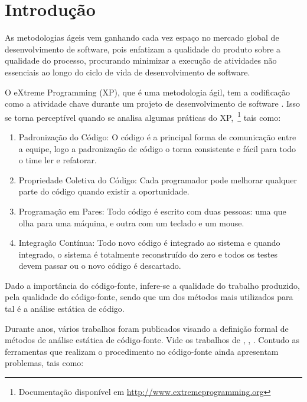 \chapter{Introdução}

As metodologias ágeis vem ganhando cada vez espaço no mercado global 
de desenvolvimento de software, pois enfatizam a qualidade do produto 
sobre a qualidade do processo, procurando minimizar a execução 
de atividades não essenciais ao longo do ciclo de vida de 
desenvolvimento de software. 

O eXtreme Programming (XP), que é uma metodologia ágil, tem a codificação como a 
atividade chave durante um projeto de desenvolvimento de software 
\cite{beck1999}. Isso se torna perceptível quando se analisa algumas práticas do 
XP,~\footnote{Documentação disponível em \url{http://www.extremeprogramming.org}}
tais como:

\begin{enumerate}
\item Padronização do Código: O código é a principal forma de comunicação entre 
a equipe, logo a padronização de código o torna consistente e fácil para todo o 
time ler e refatorar. 
\item Propriedade Coletiva do Código: Cada programador pode melhorar qualquer 
parte do código quando existir a oportunidade.
\item Programação em Pares: Todo código é escrito com duas pessoas: uma que olha 
para uma máquina, e outra com um teclado e um mouse.
\item Integração Contínua: Todo novo código é integrado ao sistema e quando 
integrado, o sistema é totalmente reconstruído do zero e todos os testes devem 
passar ou o novo código é descartado.

\end{enumerate} 

Dado a importância do código-fonte, infere-se a qualidade do trabalho produzido, 
pela qualidade do código-fonte, sendo que um dos métodos mais utilizados
para tal é a análise estática de código. 

Durante anos, vários trabalhos foram publicados visando a definição formal de 
métodos de análise estática de código-fonte. Vide os trabalhos de 
, , .
Contudo as ferramentas que realizam o procedimento no código-fonte ainda 
apresentam problemas, tais como:

